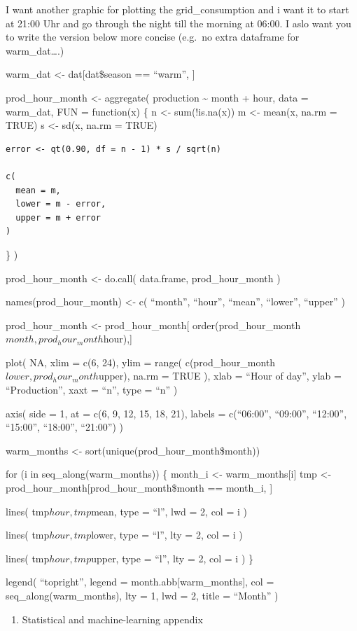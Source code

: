 \documentclass[
]{article}
\providecommand{\tightlist}{%
  \setlength{\itemsep}{0pt}\setlength{\parskip}{0pt}}
\begin{document}
I want another graphic for plotting the grid\_consumption and i want it
to start at 21:00 Uhr and go through the night till the morning at
06:00. I aslo want you to write the version below more concise (e.g.~no
extra dataframe for warm\_dat\ldots.)

warm\_dat \textless- dat{[}dat\$season == ``warm'', {]}

prod\_hour\_month \textless- aggregate( production \textasciitilde{}
month + hour, data = warm\_dat, FUN = function(x) \{ n \textless-
sum(!is.na(x)) m \textless- mean(x, na.rm = TRUE) s \textless- sd(x,
na.rm = TRUE)

\begin{verbatim}
error <- qt(0.90, df = n - 1) * s / sqrt(n)

c(
  mean = m,
  lower = m - error,
  upper = m + error
)
\end{verbatim}

\} )

prod\_hour\_month \textless- do.call( data.frame, prod\_hour\_month )

names(prod\_hour\_month) \textless- c( ``month'', ``hour'', ``mean'',
``lower'', ``upper'' )

prod\_hour\_month \textless- prod\_hour\_month{[}
order(prod\_hour\_month\(month, prod_hour_month\)hour),{]}

plot( NA, xlim = c(6, 24), ylim = range(
c(prod\_hour\_month\(lower, prod_hour_month\)upper), na.rm = TRUE ),
xlab = ``Hour of day'', ylab = ``Production'', xaxt = ``n'', type =
``n'' )

axis( side = 1, at = c(6, 9, 12, 15, 18, 21), labels = c(``06:00'',
``09:00'', ``12:00'', ``15:00'', ``18:00'', ``21:00'') )

warm\_months \textless- sort(unique(prod\_hour\_month\$month))

for (i in seq\_along(warm\_months)) \{ month\_i \textless-
warm\_months{[}i{]} tmp \textless-
prod\_hour\_month{[}prod\_hour\_month\$month == month\_i, {]}

lines( tmp\(hour,
    tmp\)mean, type = ``l'', lwd = 2, col = i )

lines( tmp\(hour,
    tmp\)lower, type = ``l'', lty = 2, col = i )

lines( tmp\(hour,
    tmp\)upper, type = ``l'', lty = 2, col = i ) \}

legend( ``topright'', legend = month.abb{[}warm\_months{]}, col =
seq\_along(warm\_months), lty = 1, lwd = 2, title = ``Month'' )

\begin{enumerate}
\def\labelenumi{\arabic{enumi}.}
\setcounter{enumi}{8}
\tightlist
\item
  Statistical and machine-learning appendix
\end{enumerate}
\end{document}
